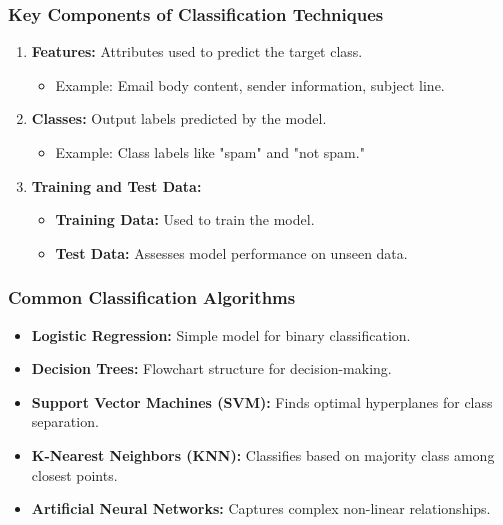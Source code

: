 \documentclass[aspectratio=169]{beamer}
\begin{document}
\begin{frame}[fragile]
    \frametitle{Key Components of Classification Techniques}
    \begin{enumerate}
        \item \textbf{Features:} Attributes used to predict the target class.
            \begin{itemize}
                \item Example: Email body content, sender information, subject line.
            \end{itemize}
        
        \item \textbf{Classes:} Output labels predicted by the model.
            \begin{itemize}
                \item Example: Class labels like "spam" and "not spam."
            \end{itemize}
        
        \item \textbf{Training and Test Data:}
            \begin{itemize}
                \item \textbf{Training Data:} Used to train the model.
                \item \textbf{Test Data:} Assesses model performance on unseen data.
            \end{itemize}
    \end{enumerate}
\end{frame}

\begin{frame}[fragile]
    \frametitle{Common Classification Algorithms}
    \begin{itemize}
        \item \textbf{Logistic Regression:} Simple model for binary classification.
        \item \textbf{Decision Trees:} Flowchart structure for decision-making.
        \item \textbf{Support Vector Machines (SVM):} Finds optimal hyperplanes for class separation.
        \item \textbf{K-Nearest Neighbors (KNN):} Classifies based on majority class among closest points.
        \item \textbf{Artificial Neural Networks:} Captures complex non-linear relationships.
    \end{itemize}
\end{frame}
\end{document}
